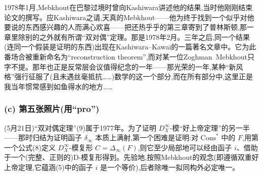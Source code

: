 \noindent 1978年1月,Mebkhout在巴黎过境时曾向Kashiwara讲述他的结果,当时他刚刚结束论文的撰写。应Kashiwara之请,天真的Mebkhout——他为终于找到一个似乎对他要说的东西感兴趣的人而满心欢喜——把还热乎乎的第三章寄到了普林斯顿,那一章里除别的之外就有所谓“双对偶”定理。那是1978年2月。三年之后,同一个结果(连同一个假装是证明的东西)出现在Kashiwara--Kawai的一篇著名文章中。它为此番场合被重新命名为“reconstruction theorem”,而对某一位Zoghman~Mebkhout只字不提。那年也正是反常层会议值得纪念的一年——那光荣的一年,某种“新风格”强行征服了(且未遇丝毫抵抗……)数学的这一个部分,而在所有部分中,这里正是我当年惯常感到如鱼得水的地方……

\subsubsection*{(c) 第五张照片(用“pro”)}


\dmark{}(5月21日)“双对偶定理”(9)属于1977年。为了证明 $D^{\infty}_{X}$-模“好上帝定理”的另一半——那时归结为证明函子 $\delta_{\infty}$ 本质上满射,第一个困难是证明:对 $\mathrm{Cons}^{*}$ 中的 $F$,用第一个公式(8)定义 $D^{\infty}_{X}$-模复形 $C=\Delta_{\infty}(F)$,则它至少局部地可以经由函子 $i$、借助于一个(完整、正则的)D-模复形得到。先验地,按照Mebkhout的观念(即遵循双重好上帝定理,它蕴涵(5)中的函子 $i$ 是一个等价),后者除唯一拟同构外必定唯一。

